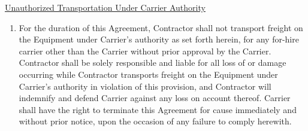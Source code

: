 \underline{Unauthorized Transportation Under Carrier Authority}
\begin{enumerate}
    \item For the duration of this Agreement, Contractor shall not
    transport freight on the Equipment under Carrier's authority as set
    forth herein, for any for-hire carrier other than the Carrier without
    prior approval by the Carrier. Contractor shall be solely responsible
    and liable for all loss of or damage occurring while Contractor
    transports freight on the Equipment under Carrier's authority in
    violation of this provision, and Contractor will indemnify and defend
    Carrier against any loss on account thereof. Carrier shall have the
    right to terminate this Agreement for cause immediately and without
    prior notice, upon the occasion of any failure to comply herewith.
\end{enumerate}